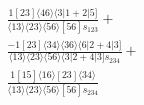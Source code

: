 \documentclass[varwidth, border=5pt]{standalone}
\begin{document}
\begin{my}
$\begin{gathered}
\scriptscriptstyle\frac{1[23]⟨46⟩⟨3|1+2|5]}{⟨13⟩⟨23⟩⟨56⟩[56]s_{123}}+\\
\scriptscriptstyle\frac{-1[23]⟨34⟩⟨36⟩⟨6|2+4|3]}{⟨13⟩⟨23⟩⟨56⟩⟨3|2+4|3]s_{234}}+\\
\scriptscriptstyle\frac{1[15]⟨16⟩[23]⟨34⟩}{⟨13⟩⟨23⟩⟨56⟩[56]s_{234}}\phantom{+}
\end{gathered}$
\end{my}
\end{document}
